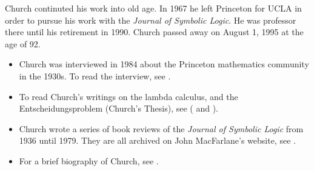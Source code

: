 \documentclass[../../../include/open-logic-section]{subfiles}
\begin{document}
Church continuted his work into old age. In 1967 he left Princeton for UCLA
in order to pursue his work with the \emph{Journal of Symbolic Logic}. He
was professor there until his retirement in 1990. Church passed away on
August 1, 1995 at the age of 92.


\begin{reading} 
\begin{itemize} 
\item Church was interviewed in 1984 about
the Princeton mathematics community in the 1930s. To read the interview,
see \citet{Aspray1984}.

\item To read Church's writings on the lambda calculus, and the
Entscheidungsproblem (Church's Thesis), see (\citeyear{Church1936} and
\citeyear{Church1936a}).

\item Church wrote a series of book reviews of the \emph{Journal of
Symbolic Logic} from 1936 until 1979. They are all archived on John
MacFarlane's website, see \citet{MacFarlane2015}.

\item For a brief biography of Church, see \citet{EndertonND}.

\end{itemize} 
\end{reading} 
\end{document}
